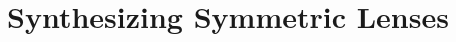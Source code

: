 \documentclass[acmsmall,screen,anonymous]{acmart}
\begin{document}







\title{Synthesizing Symmetric Lenses}
\end{document}
